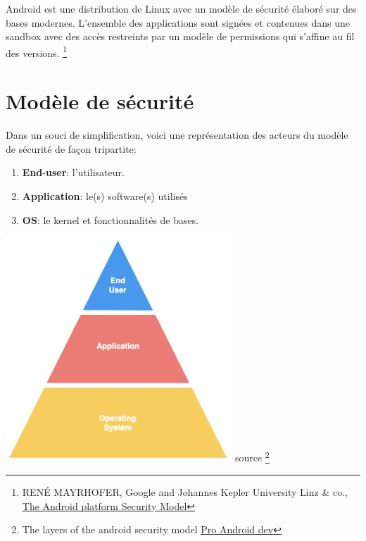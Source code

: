 \documentclass[
  french,
  paper=a4,
  ,captions=tableheading
]{scrartcl}
\providecommand{\tightlist}{%
  \setlength{\itemsep}{0pt}\setlength{\parskip}{0pt}}
\begin{document}
Android est une distribution de Linux avec un modèle de sécurité élaboré
sur des bases modernes. L'ensemble des applications sont signées et
contenues dans une sandbox avec des accès restreints par un modèle de
permissions qui s'affine au fil des versions. \footnote{RENÉ MAYRHOFER,
  Google and Johannes Kepler University Linz \& co.,
  \href{https://arxiv.org/pdf/1904.05572.pdf}{The Android platform
  Security Model}}

\newpage

\hypertarget{moduxe8le-de-suxe9curituxe9}{%
\section{Modèle de sécurité}\label{moduxe8le-de-suxe9curituxe9}}

Dans un souci de simplification, voici une représentation des acteurs du
modèle de sécurité de façon tripartite:

\begin{enumerate}
\def\labelenumi{\arabic{enumi}.}
\tightlist
\item
  \textbf{End}-\textbf{user}: l'utilisateur.
\item
  \textbf{Application}: le(s) software(s) utilisés
\item
  \textbf{OS}: le kernel et fonctionnalités de bases.
\end{enumerate}

\begin{center}
\includegraphics[width=85mm]{model.png} source \footnote{The layers of the android
  security model
  \href{https://proandroiddev.com/the-layers-of-the-android-security-model-90f471015ae6}{Pro
  Android dev}}
\end{center}
\end{document}
